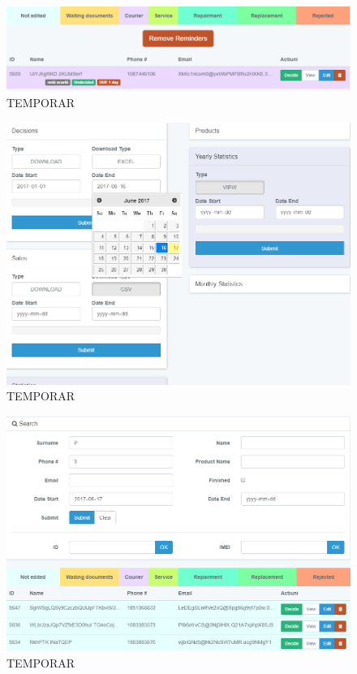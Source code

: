 	\begin{figure}
		\includegraphics[width=\linewidth]{../imagini/claims_reminder_view.png}
		\caption{TEMPORAR}
		\label{fig:TEMP}
	\end{figure}
	\begin{figure}
		\includegraphics[width=\linewidth]{../imagini/claims_reports.png}
		\caption{TEMPORAR}
		\label{fig:TEMP}
	\end{figure}
	\begin{figure}
		\includegraphics[width=\linewidth]{../imagini/claims_search.png}
		\caption{TEMPORAR}
		\label{fig:TEMP}
	\end{figure}
